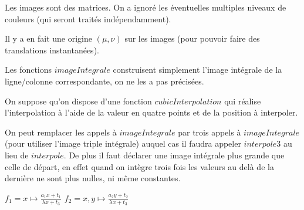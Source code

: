 


Les images sont des matrices. On a ignoré les éventuelles multiples niveaux de couleurs (qui seront traités indépendamment).

Il y a en fait une origine $(\mu,\nu)$ sur les images (pour pouvoir faire des translations instantanées).

\medbreak
Les fonctions $imageIntegrale$ construisent simplement l'image intégrale de la ligne/colonne correspondante, on ne les a pas précisées.

On suppose qu'on dispose d'une fonction $cubicInterpolation$ qui réalise l'interpolation à l'aide de la valeur en quatre points et de la position à interpoler.

On peut remplacer les appels à $imageIntegrale$ par trois appels à $imageIntegrale$ (pour utiliser l'image triple intégrale) auquel cas il faudra appeler $interpole3$ au lieu de $interpole$. De plus il faut déclarer une image intégrale plus grande que celle de départ, en effet quand on intègre trois fois les valeurs au delà de la dernière ne sont plus nulles, ni même constantes.


\begin{algorithm}[H]
\caption{$applyHomography(img,imgf,H)$}
$f_1 = x\mapsto \frac{a_1x + t_1}{\lambda x + t_3}$ \;
$f_2 = x,y\mapsto \frac{a_2y + t_2}{\lambda x + t_3}$ \;
\end{algorithm}


